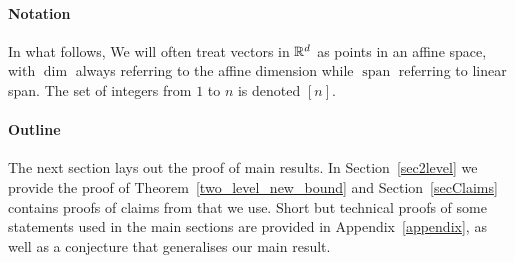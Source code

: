 \paragraph{Notation}
In what follows, We will often treat vectors in ${\mathbb{R}}^d$ as points in an affine space, with $\operatorname{dim}$ always referring to the affine dimension while $\operatorname{span}$ referring to linear span. The set of integers  from $1$ to $n$ is denoted $[n]$. 

\paragraph{Outline}
The next section lays out the proof of main results. In Section~\ref{sec2level} we provide the proof of Theorem~\ref{two_level_new_bound} and Section~\ref{secClaims} contains proofs of claims from \cite{kupavskii22} that we use. Short but technical proofs of some statements used in the main sections are provided in Appendix~\ref{appendix}, as well as a conjecture that generalises our main result.